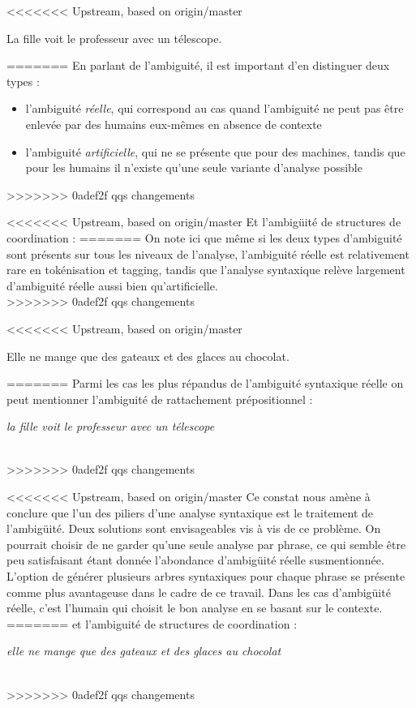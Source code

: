 \documentclass[12pt]{article}
\begin{document}
<<<<<<< Upstream, based on origin/master
\begin{exe}
\ex La fille voit le professeur avec un t\'elescope.
\end{exe}
=======
En parlant de l'ambiguit\'e, il est important d'en distinguer deux types :
\begin{itemize}
  \item l'ambiguit\'e \emph{r\'eelle}, qui correspond au cas quand l'ambiguit\'e
ne peut pas \^etre enlev\'ee par des humains eux-m\^emes en absence de contexte
\item l'ambiguit\'e \emph{artificielle}, qui ne se pr\'esente que pour des machines,
tandis que pour les humains il n'existe qu'une seule variante d'analyse possible
\end{itemize} 
>>>>>>> 0adef2f qqs changements

<<<<<<< Upstream, based on origin/master
Et l'ambig\"uit\'e de structures de coordination :
=======
On note ici que m\^eme si les deux types d'ambiguit\'e sont pr\'esents sur tous
les niveaux de l'analyse, l'ambiguit\'e r\'eelle est relativement rare en
tok\'enisation et tagging, tandis que l'analyse syntaxique rel\`eve largement
d'ambiguit\'e r\'eelle aussi bien qu'artificielle. \\
>>>>>>> 0adef2f qqs changements

<<<<<<< Upstream, based on origin/master
\begin{exe}
\ex Elle ne mange que des gateaux et des glaces au chocolat.
\end{exe}
=======
Parmi les cas les plus r\'epandus de l'ambiguit\'e syntaxique r\'eelle on peut
mentionner l'ambiguit\'e de rattachement pr\'epositionnel : \\
\centerline{\textit{la fille voit le professeur avec un t\'elescope}}\\
>>>>>>> 0adef2f qqs changements

<<<<<<< Upstream, based on origin/master
Ce constat nous am\`ene \`a conclure que l'un des piliers d'une
analyse syntaxique est le traitement de l'ambig\"uit\'e. Deux solutions sont
envisageables vis \`a vis de ce probl\`eme. On pourrait choisir de ne garder
qu'une seule analyse par phrase, ce qui semble \^etre peu satisfaisant \'etant
donn\'ee l'abondance d'ambig\"uit\'e r\'eelle susmentionn\'ee. L'option de
g\'en\'erer plusieurs arbres syntaxiques pour chaque phrase se pr\'esente comme
plus avantageuse dans le cadre de ce travail. Dans les cas d'ambig\"uit\'e
r\'eelle, c'est l'humain qui choisit le bon analyse en se basant sur le
contexte.
=======
et l'ambiguit\'e de structures de coordination : \\
\centerline{\textit{elle ne mange que des gateaux et des glaces au chocolat}}\\
>>>>>>> 0adef2f qqs changements
\end{document}
